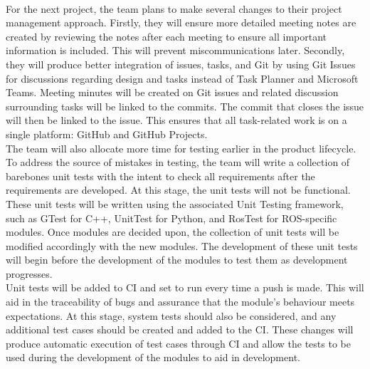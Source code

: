\documentclass{article}
\begin{document}
\\ \indent For the next project, the team plans to make several changes to their project management approach. Firstly, they will ensure more detailed meeting notes are created by reviewing the notes after each meeting to ensure all important information is included. This will prevent miscommunications later. Secondly, they will produce better integration of issues, tasks, and Git by using Git Issues for discussions regarding design and tasks instead of Task Planner and Microsoft Teams. Meeting minutes will be created on Git issues and related discussion surrounding tasks will be linked to the commits. The commit that closes the issue will then be linked to the issue. This ensures that all task-related work is on a single platform: GitHub and GitHub Projects.
\\ \indent The team will also allocate more time for testing earlier in the product lifecycle. To address the source of mistakes in testing, the team will write a collection of barebones unit tests with the intent to check all requirements after the requirements are developed. At this stage, the unit tests will not be functional. These unit tests will be written using the associated Unit Testing framework, such as GTest for C++, UnitTest for Python, and RosTest for ROS-specific modules. Once modules are decided upon, the collection of unit tests will be modified accordingly with the new modules. The development of these unit tests will begin before the development of the modules to test them as development progresses.
\\ \indent Unit tests will be added to CI and set to run every time a push is made. This will aid in the traceability of bugs and assurance that the module's behaviour meets expectations. At this stage, system tests should also be considered, and any additional test cases should be created and added to the CI. These changes will produce automatic execution of test cases through CI and allow the tests to be used during the development of the modules to aid in development.
\end{document}
